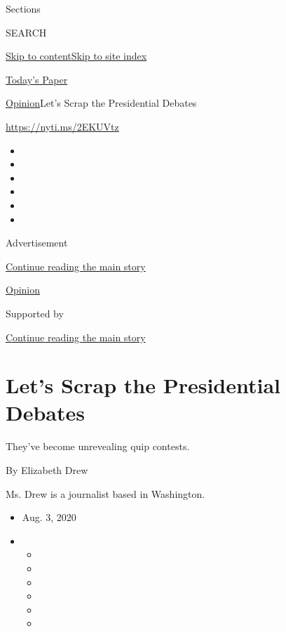 Sections

SEARCH

\protect\hyperlink{site-content}{Skip to
content}\protect\hyperlink{site-index}{Skip to site index}

\href{https://myaccount.nytimes.com/auth/login?response_type=cookie\&client_id=vi}{}

\href{https://www.nytimes.com/section/todayspaper}{Today's Paper}

\href{/section/opinion}{Opinion}\textbar{}Let's Scrap the Presidential
Debates

\url{https://nyti.ms/2EKUVtz}

\begin{itemize}
\item
\item
\item
\item
\item
\item
\end{itemize}

Advertisement

\protect\hyperlink{after-top}{Continue reading the main story}

\href{/section/opinion}{Opinion}

Supported by

\protect\hyperlink{after-sponsor}{Continue reading the main story}

\hypertarget{lets-scrap-the-presidential-debates}{%
\section{Let's Scrap the Presidential
Debates}\label{lets-scrap-the-presidential-debates}}

They've become unrevealing quip contests.

By Elizabeth Drew

Ms. Drew is a journalist based in Washington.

\begin{itemize}
\item
  Aug. 3, 2020
\item
  \begin{itemize}
  \item
  \item
  \item
  \item
  \item
  \item
  \end{itemize}
\end{itemize}


